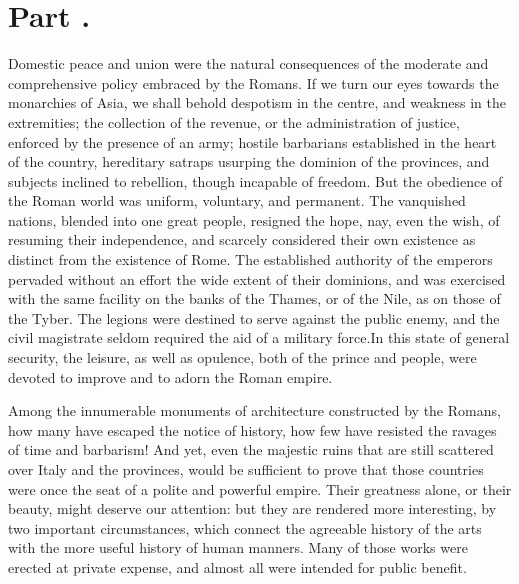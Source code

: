 \section{Part \thesection.}
\thispagestyle{simple}

Domestic peace and union were the natural consequences of the
moderate and comprehensive policy embraced by the Romans. If we
turn our eyes towards the monarchies of Asia, we shall behold
despotism in the centre, and weakness in the extremities; the
collection of the revenue, or the administration of justice,
enforced by the presence of an army; hostile barbarians
established in the heart of the country, hereditary satraps
usurping the dominion of the provinces, and subjects inclined to
rebellion, though incapable of freedom. But the obedience of the
Roman world was uniform, voluntary, and permanent. The vanquished
nations, blended into one great people, resigned the hope, nay,
even the wish, of resuming their independence, and scarcely
considered their own existence as distinct from the existence of
Rome. The established authority of the emperors pervaded without
an effort the wide extent of their dominions, and was exercised
with the same facility on the banks of the Thames, or of the
Nile, as on those of the Tyber. The legions were destined to
serve against the public enemy, and the civil magistrate seldom
required the aid of a military force.\footnotemark[63] In this state of general
security, the leisure, as well as opulence, both of the prince
and people, were devoted to improve and to adorn the Roman
empire.


Among the innumerable monuments of architecture constructed by
the Romans, how many have escaped the notice of history, how few
have resisted the ravages of time and barbarism! And yet, even
the majestic ruins that are still scattered over Italy and the
provinces, would be sufficient to prove that those countries were
once the seat of a polite and powerful empire. Their greatness
alone, or their beauty, might deserve our attention: but they are
rendered more interesting, by two important circumstances, which
connect the agreeable history of the arts with the more useful
history of human manners. Many of those works were erected at
private expense, and almost all were intended for public benefit.

